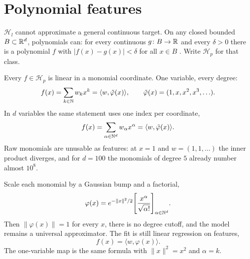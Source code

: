 \section{Polynomial features}
\label{sec:poly}

\(\mathcal{H}_l\) cannot approximate a general continuous target.
On any closed bounded \(B\subset\mathbb{R}^d\), polynomials can: for every continuous \(g\colon B\to\mathbb{R}\) and every \(\delta>0\) there is a polynomial \(f\) with \(\lvert f(x)-g(x)\rvert<\delta\) for all \(x\in B\) \cite{weierstrass1885,stone1948}.
Write \(\mathcal{H}_p\) for that class.

Every \(f\in\mathcal{H}_p\) is linear in a monomial coordinate.
One variable, every degree:
\begin{equation}
f(x)=\sum_{k\in\mathbb{N}} w_k x^k = \langle w,\tilde\varphi(x)\rangle,
\qquad
\tilde\varphi(x)=(1,x,x^2,x^3,\ldots).
\label{eq:phi-1d}
\end{equation}
In \(d\) variables the same statement uses one index per coordinate,
\begin{equation}
f(x)=\sum_{\alpha\in\mathbb{N}^d} w_\alpha x^\alpha = \langle w,\tilde\varphi(x)\rangle.
\label{eq:phi-d}
\end{equation}
Raw monomials are unusable as features: at \(x=1\) and \(w=(1,1,\ldots)\) the inner product diverges, and for \(d=100\) the monomials of degree \(5\) already number almost \(10^8\).

Scale each monomial by a Gaussian bump and a factorial,
\begin{equation}
\varphi(x)
= e^{-\lVert x\rVert^2/2}
\Biggl[\frac{x^\alpha}{\sqrt{\alpha!}}\Biggr]_{\alpha\in\mathbb{N}^d}.
\label{eq:phi}
\end{equation}
Then \(\lVert\varphi(x)\rVert=1\) for every \(x\), there is no degree cutoff, and the model remains a universal approximator.
The fit is still linear regression on features,
\begin{equation}
f(x)=\langle w,\varphi(x)\rangle.
\label{eq:poly-fit}
\end{equation}
The one-variable map is the same formula with \(\lVert x\rVert^2=x^2\) and \(\alpha=k\).

